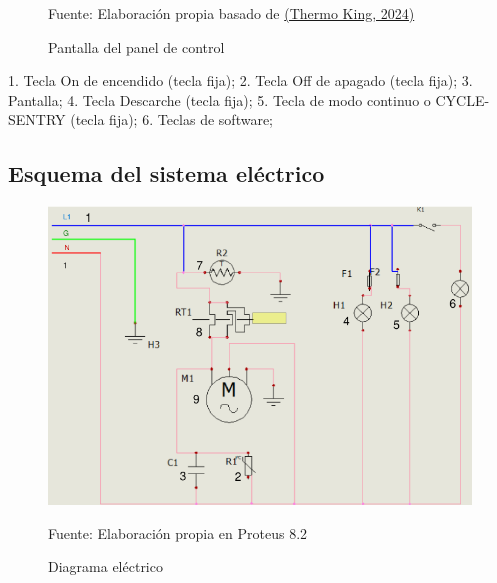 \begin{figure}[H]
	\centering
\caption{Pantalla del panel de control}
Fuente: Elaboración propia basado de \hyperref[fig:axo-manual-thermo-king]{(Thermo King, 2024)}
\end{figure}
 
 
 
 
 
   1. Tecla On de encendido (tecla fija);
   2. Tecla Off de apagado (tecla fija);
   3. Pantalla;
   4. Tecla Descarche (tecla fija);
   5. Tecla de modo continuo o CYCLE-SENTRY (tecla fija);
   6. Teclas de software;
 
 
\subsection{Esquema del sistema eléctrico}
\begin{figure}[H]
	\centering
	\includegraphics[width=0.7\linewidth]{figures/4-diag-electrico}
	\caption{Diagrama eléctrico}
	Fuente: Elaboración propia en Proteus 8.2
	\label{fig:4-diag-electrico}	
\end{figure}

